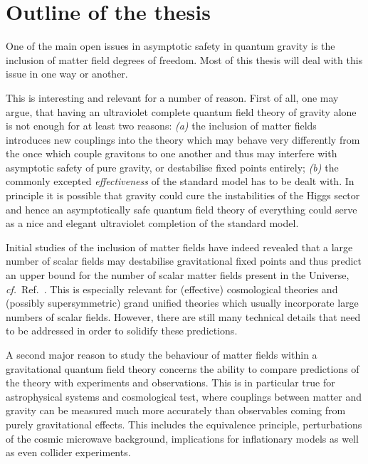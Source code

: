 \documentclass[11pt]{book} %
\newcommand\cf{\textit{cf.}\ }
\numberwithin{equation}{chapter}
\begin{document}
\section*{Outline of the thesis}

One of the main open issues in asymptotic safety in quantum gravity is
the inclusion of matter field degrees of freedom. Most of this thesis
will deal with this issue in one way or another.

This is interesting and relevant for a number of reason. First of all,
one may argue, that having an ultraviolet complete quantum field theory
of gravity alone is not enough for at least two reasons:
\textit{(a)} the inclusion of matter fields introduces new couplings into
the theory which may behave very differently from the once which couple
gravitons to one another and thus may interfere with asymptotic safety of
pure gravity, or destabilise fixed points entirely;
\textit{(b)} the commonly excepted \textit{effectiveness} of the
standard model has to be dealt with.
In principle it is possible that gravity could cure the instabilities
of the Higgs sector and hence an asymptotically safe quantum
field theory of everything could serve as a nice and elegant ultraviolet completion
of the standard model.

Initial studies of the inclusion of matter fields have indeed revealed that
a large number of scalar fields may destabilise gravitational fixed points
and thus predict an upper bound for the number of scalar matter fields
present in the Universe, \cf Ref.~\cite{Dona:2013qba}. This is especially relevant
for (effective) cosmological theories and (possibly supersymmetric) grand unified
theories which usually incorporate large numbers of scalar fields.
However, there are still many technical details that need to be addressed
in order to solidify these predictions.

A second major reason to study the behaviour of matter fields within a gravitational
quantum field theory concerns the ability to compare predictions of the theory
with experiments and observations. This is in particular true for astrophysical
systems and cosmological test, where couplings between matter and gravity can
be measured much more accurately than observables coming from purely gravitational
effects. This includes the equivalence principle, perturbations of the
cosmic microwave background, implications for inflationary models as well as
even collider experiments.
\end{document}
